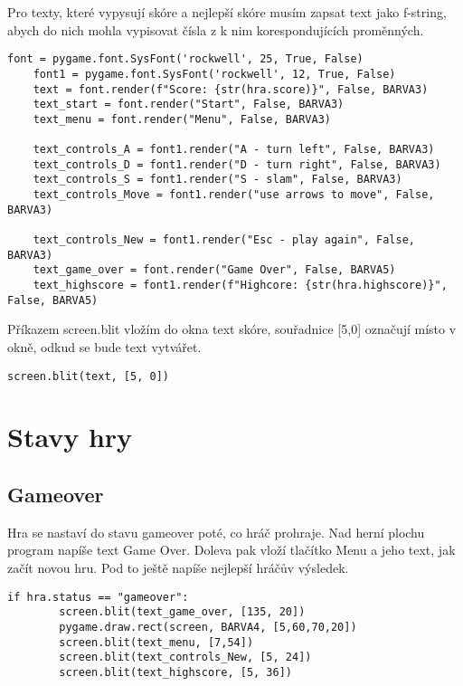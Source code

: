 \documentclass[12pt]{report}			%
\begin{document}
Pro texty, které vypysují skóre a nejlepší skóre musím zapsat text jako f-string, abych do nich mohla vypisovat čísla z k nim korespondujících proměnných.
\begin{lstlisting}[title={Program tetris.py}, caption={Texty}, 							label={lst:tetris.py}]
    font = pygame.font.SysFont('rockwell', 25, True, False)
    font1 = pygame.font.SysFont('rockwell', 12, True, False)
    text = font.render(f"Score: {str(hra.score)}", False, BARVA3)
    text_start = font.render("Start", False, BARVA3)
    text_menu = font.render("Menu", False, BARVA3)

    text_controls_A = font1.render("A - turn left", False, BARVA3)
    text_controls_D = font1.render("D - turn right", False, BARVA3)
    text_controls_S = font1.render("S - slam", False, BARVA3)
    text_controls_Move = font1.render("use arrows to move", False, BARVA3)
    
    text_controls_New = font1.render("Esc - play again", False, BARVA3)
    text_game_over = font.render("Game Over", False, BARVA5) 
    text_highscore = font1.render(f"Highcore: {str(hra.highscore)}", False, BARVA5)   
\end{lstlisting}
Příkazem screen.blit vložím do okna text skóre, souřadnice [5,0] označují místo v okně, odkud se bude text vytvářet.
\begin{lstlisting}[title={Program tetris.py}, caption={Nakreslení skóre}, 							label={lst:tetris.py}]
    screen.blit(text, [5, 0])
\end{lstlisting}
		\section{Stavy hry}
			\subsection{Gameover}
Hra se nastaví do stavu gameover poté, co hráč prohraje. Nad herní plochu program napíše text Game Over. Doleva pak vloží tlačítko Menu a jeho text, jak začít novou hru. Pod to ještě napíše nejlepší hráčův výsledek.
\begin{lstlisting}[title={Program tetris.py}, caption={Stav "gameover"}, 							label={lst:tetris.py}]
    if hra.status == "gameover":
        screen.blit(text_game_over, [135, 20])
        pygame.draw.rect(screen, BARVA4, [5,60,70,20])
        screen.blit(text_menu, [7,54])
        screen.blit(text_controls_New, [5, 24])
        screen.blit(text_highscore, [5, 36])
\end{lstlisting}
\end{document}
